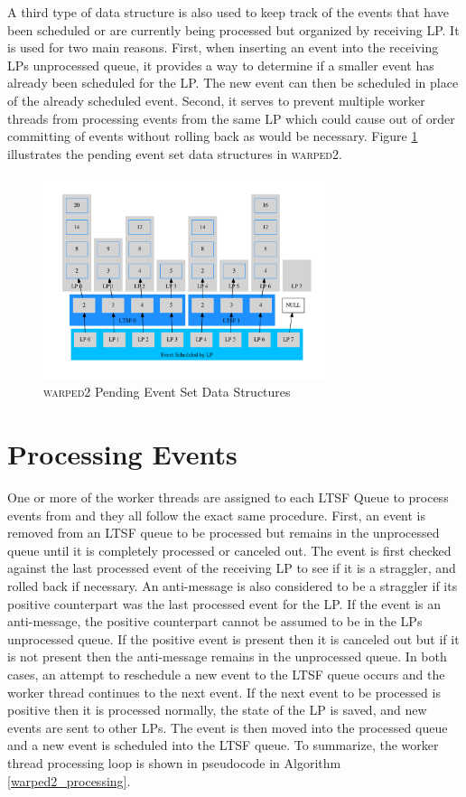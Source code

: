 \documentclass[11pt]{book}
\begin{document}
A third type of data structure is also used to keep track of the events that have been scheduled or
are currently being processed but organized by receiving LP.  It is used for two main reasons.
First, when inserting an event into the receiving LPs unprocessed queue, it provides a way to
determine if a smaller event has already been scheduled for the LP.  The new event can then be
scheduled in place of the already scheduled event.  Second, it serves to prevent multiple worker
threads from processing events from the same LP which could cause out of order committing of events
without rolling back as would be necessary.  Figure \ref{pending_event_set} illustrates the pending
event set data structures in \textsc{warped2}.

\begin{figure}
    \centering
    \includegraphics[width=0.75\textwidth,quiet]{figs/graphviz/pending_event_set.pdf}
    \caption{\textsc{warped2} Pending Event Set Data Structures}\label{pending_event_set}
\end{figure}

\section{Processing Events}

One or more of the worker threads are assigned to each LTSF Queue to process events from and they
all follow the exact same procedure.  First, an event is removed from an LTSF queue to be processed
but remains in the unprocessed queue until it is completely processed or canceled out.  The event
is first checked against the last processed event of the receiving LP to see if it is a straggler,
and rolled back if necessary.  An anti-message is also considered to be a straggler if its positive
counterpart was the last processed event for the LP.  If the event is an anti-message, the positive
counterpart cannot be assumed to be in the LPs unprocessed queue.  If the positive event is present
then it is canceled out but if it is not present then the anti-message remains in the unprocessed
queue.  In both cases, an attempt to reschedule a new event to the LTSF queue occurs and the worker
thread continues to the next event.  If the next event to be processed is positive then it is
processed normally, the state of the LP is saved, and new events are sent to other LPs.  The event
is then moved into the processed queue and a new event is scheduled into the LTSF queue.  To
summarize, the worker thread processing loop is shown in pseudocode in Algorithm
\ref{warped2_processing}.
\end{document}
